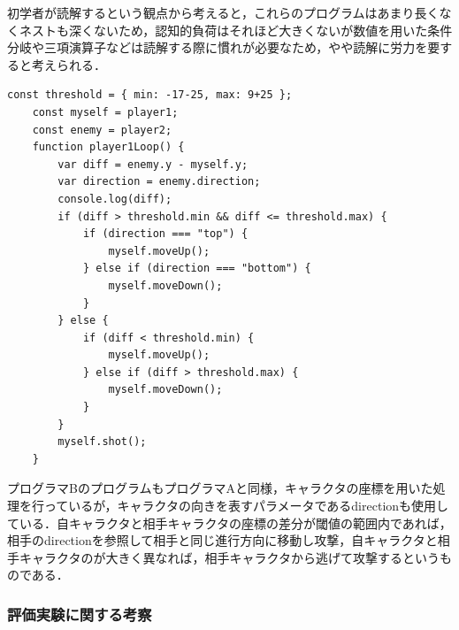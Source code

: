 \begin{itemize}
  初学者が読解するという観点から考えると，これらのプログラムはあまり長くなくネストも深くないため，認知的負荷はそれほど大きくないが数値を用いた条件分岐や三項演算子などは読解する際に慣れが必要なため，やや読解に労力を要すると考えられる．

  \begin{lstlisting}[caption=プログラマB, label=shimizu]
    const threshold = { min: -17-25, max: 9+25 };
    const myself = player1;
    const enemy = player2;
    function player1Loop() {
        var diff = enemy.y - myself.y;
        var direction = enemy.direction;
        console.log(diff);
        if (diff > threshold.min && diff <= threshold.max) {
            if (direction === "top") {
                myself.moveUp();
            } else if (direction === "bottom") {
                myself.moveDown();
            }
        } else {
            if (diff < threshold.min) {
                myself.moveUp();
            } else if (diff > threshold.max) {
                myself.moveDown();
            }
        }
        myself.shot();
    }
  \end{lstlisting}
  プログラマBのプログラムもプログラマAと同様，キャラクタの座標を用いた処理を行っているが，キャラクタの向きを表すパラメータであるdirectionも使用している．自キャラクタと相手キャラクタの座標の差分が閾値の範囲内であれば，相手のdirectionを参照して相手と同じ進行方向に移動し攻撃，自キャラクタと相手キャラクタのが大きく異なれば，相手キャラクタから逃げて攻撃するというものである．

\end{itemize}


\subsubsection{評価実験に関する考察}

